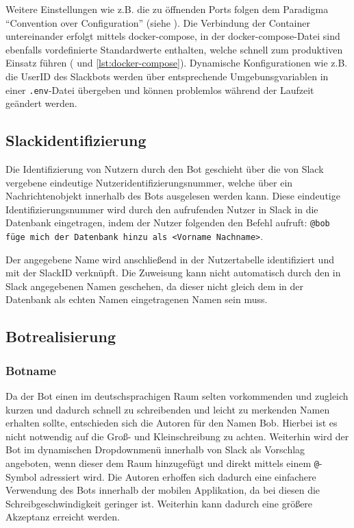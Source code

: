 Weitere Einstellungen wie z.B. die zu öffnenden Ports folgen dem Paradigma \enquote{Convention over Configuration} (siehe \cite{NicholasChenConventionConfiguration2006}). Die Verbindung der Container untereinander erfolgt mittels docker-compose, in der docker-compose-Datei sind ebenfalls vordefinierte Standardwerte enthalten, welche schnell zum produktiven Einsatz führen (\cite{DockerInc.DockerCompose2018} und \autoref{lst:docker-compose}).
Dynamische Konfigurationen wie z.B. die UserID des Slackbots werden über entsprechende Umgebunsgvariablen in einer \verb+.env+-Datei übergeben und können problemlos während der Laufzeit geändert werden.





\subsection{Slackidentifizierung}

Die Identifizierung von Nutzern durch den Bot geschieht über die von Slack vergebene eindeutige Nutzeridentifizierungsnummer, welche über ein Nachrichtenobjekt innerhalb des Bots ausgelesen werden kann. Diese eindeutige Identifizierungsnummer wird durch den aufrufenden Nutzer in Slack in die Datenbank eingetragen, indem der Nutzer folgenden den Befehl aufruft: 
\texttt{@bob füge mich der Datenbank hinzu als <Vorname Nachname>}.

Der angegebene Name wird anschließend in der Nutzertabelle identifiziert und mit der SlackID verknüpft. Die Zuweisung kann nicht automatisch durch den in Slack angegebenen Namen geschehen, da dieser nicht gleich dem in der Datenbank als echten Namen eingetragenen Namen sein muss.



\subsection{Botrealisierung}
\subsubsection{Botname}
Da der Bot einen im deutschsprachigen Raum selten vorkommenden und zugleich kurzen und dadurch schnell zu schreibenden und leicht zu merkenden Namen erhalten sollte, entschieden sich die Autoren für den Namen Bob. Hierbei ist es nicht notwendig auf die Groß- und Kleinschreibung zu achten. Weiterhin wird der Bot im dynamischen Dropdownmenü innerhalb von Slack als Vorschlag angeboten, wenn dieser dem Raum hinzugefügt und direkt mittels einem \texttt{@}-Symbol adressiert wird. Die Autoren erhoffen sich dadurch eine einfachere Verwendung des Bots innerhalb der mobilen Applikation, da bei diesen die Schreibgeschwindigkeit geringer ist. Weiterhin kann dadurch eine größere Akzeptanz erreicht werden.

